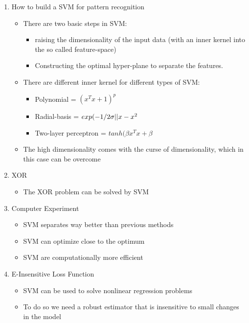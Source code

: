 \documentclass{scrartcl}
\begin{document}
\begin{enumerate}
\item How to build a SVM for pattern recognition 
	\begin{itemize}
	\item There are two basic steps in SVM:
		\begin{itemize}
		\item raising the dimensionality of the input data (with an inner kernel into the so called feature-space)
		\item Constructing the optimal hyper-plane to separate the features.
		\end{itemize}
	\item There are different inner kernel for different types of SVM:
		\begin{itemize}
		\item Polynomial = $(x^{T}x +1)^{p}$
		\item Radial-basis = $exp(-1/2\sigma ||x-x\\^{2}$
		\item Two-layer perceptron = $tanh(\beta x^{T}x+\beta$
		\end{itemize}
	\item The high dimensionality comes with the curse of dimensionality, which in this case can be overcome
	\end{itemize}


\item XOR
	\begin{itemize}
	\item  The XOR problem can be solved by SVM
	\end{itemize}


\item Computer Experiment
	\begin{itemize}
	\item SVM separates way better than previous methods
	\item SVM can optimize close to the optimum
	\item SVM are computationally more efficient
	\end{itemize}


\item E-Insensitive Loss Function
	\begin{itemize}
	\item SVM can be used to solve nonlinear regression problems
	\item To do so we need a robust estimator that is insensitive to small changes in the model
	\end{itemize}



\end{enumerate}
\end{document}
